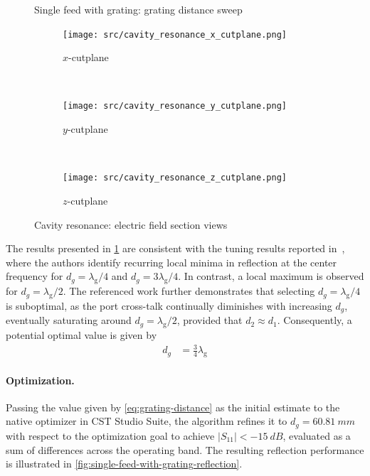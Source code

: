 \documentclass[14pt,a4paper]{ntust_report}
\begin{document}
\begin{figure}[!ht]
    \centering
    
    \caption{\label{fig:grating-distance-sweep}Single feed with grating: grating distance sweep}
\end{figure}

\begin{figure}[!ht]
    \centering
    \begin{subfigure}{.4\textwidth}
        \centering
        \texttt{[image: src/cavity\_resonance\_x\_cutplane.png]}
        \caption{\label{fig:cavity-resonance-x-cutplane}$x$-cutplane}
    \end{subfigure}
    \\[0.5cm]
    \begin{subfigure}{.4\textwidth}
        \centering
        \texttt{[image: src/cavity\_resonance\_y\_cutplane.png]}
        \caption{\label{fig:cavity-resonance-y-cutplane}$y$-cutplane}
    \end{subfigure}
    \\[0.5cm]
    \begin{subfigure}{.4\textwidth}
        \centering
        \texttt{[image: src/cavity\_resonance\_z\_cutplane.png]}
        \caption{\label{fig:cavity-resonance-z-cutplane}$z$-cutplane}
    \end{subfigure}
    \caption{\label{fig:cavity-resonant}Cavity resonance: electric field section views}
\end{figure}

The results presented in \cref{fig:grating-distance-sweep} are consistent with the tuning results reported in~\parencite{karki-et-al:dual-polarized-probe-for-planar-near-field-measurement}, where the authors identify recurring local minima in reflection at the center frequency for $d_g = \lambda_{\mathrm g}/4$ and $d_g = 3\lambda_{\mathrm g}/4$. In contrast, a local maximum is observed for $d_g = \lambda_{\mathrm g}/2$. The referenced work further demonstrates that selecting $d_g = \lambda_{\mathrm g}/4$ is suboptimal, as the port cross-talk continually diminishes with increasing $d_g$, eventually saturating around $d_g = \lambda_{\mathrm g}/2$, provided that $d_2\approx d_1$. Consequently, a potential optimal value is given by
\begin{align}
    \label{eq:grating-distance}
    d_g &= \frac{3}{4}\lambda_{\mathrm g}
\end{align}

\paragraph{Optimization.} Passing the value given by \cref{eq:grating-distance} as the initial estimate to the native optimizer in CST Studio Suite, the algorithm refines it to $d_g = \qty{60.81}{mm}$ with respect to the optimization goal to achieve $|S_{11}| < -\qty{15}{dB}$, evaluated as a sum of differences across the operating band. The resulting reflection performance is illustrated in \cref{fig:single-feed-with-grating-reflection}.
\end{document}
